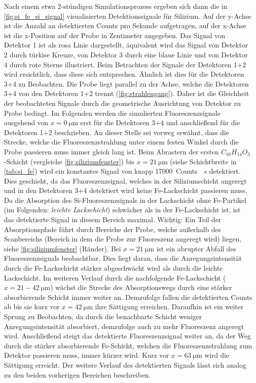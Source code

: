Nach einem etwa 2-stündigen Simulationsprozess ergeben sich dann die in \cref{fig:si_fe_si_signal} visualisierten Detektionssignale für Silizium. Auf der y-Achse ist die Anzahl an detektierten Counts pro Sekunde aufgetragen, auf der x-Achse ist die x-Position auf der Probe in Zentimeter angegeben. Das Signal von Detektor 1 ist als rosa Linie dargestellt, äquivalent wird das Signal von Detektor 2 durch türkise Kreuze, von Detektor 3 durch eine blaue Linie und von Detektor 4 durch rote Sterne illustriert. Beim Betrachten der Signale der Detektoren 1+2 wird ersichtlich, dass diese sich entsprechen. Ähnlich ist dies für die Detektoren 3+4 zu Beobachten. Die Probe liegt parallel zu der Achse, welche die Detektoren 3+4 von den Detektoren 1+2 trennt (\cref{fig:strahlengang}). Daher ist die Gleichheit der beobachteten Signale durch die geometrische Ausrichtung von Detektor zu Probe bedingt. \newlines
Im Folgenden werden die simulierten Fluoreszenzsignale ausgehend von $x=\SI{0}{\micro\meter}$ erst für die Detektoren 3+4 und anschließend für die Detektoren 1+2 beschrieben. An dieser Stelle sei vorweg erwähnt, dass die Strecke, welche die Fluoreszenzstrahlung unter einem festen Winkel durch die Probe passieren muss immer gleich lang ist.\newline
Beim Abrastern der ersten $C_{16}H_{14}O_{3}$-Schicht (vergleiche \cref{fig:siliziumfenster}) bis $x=\SI{21}{\micro\meter}$ (siehe Schichtbreite in \cref{tab:si_fe}) wird ein konstantes Signal von knapp \SI{17000}{Counts \per\second} detektiert. Dies geschieht, da das Fluoreszenzsignal, welches in der Siliziumschicht angeregt und in den Detektoren 3+4 detektiert wird keine Fe-Lackschicht passieren muss. Da die Absorption des Si-Fluoreszenzsignals in der Lackschicht ohne Fe-Partikel (im Folgenden: \textit{leichte Lackschicht}) schwächer als in der Fe-Lackschicht ist, ist das detektierte Signal in diesem Bereich maximal. Wichtig: Ein Teil der Absorptionspfade führt durch Bereiche der Probe, welche außerhalb des Scanbereichs (Bereich in dem die Probe zur Fluoreszenz angeregt wird) liegen, siehe \cref{fig:siliziumfenster} (Ränder). 
Bei $x=\SI{21}{\micro\meter}$ ist ein abrupter Abfall des Fluoreszenzsignals beobachtbar. Dies liegt daran, dass die Anregungsintensität durch die Fe-Lackschicht stärker abgeschwächt wird als durch die leichte Lackschicht. Im weiteren Verlauf durch die nachfolgende Fe-Lackschicht ($x=21-\SI{42}{\micro\meter}$) wächst die Strecke des Absorptionswegs durch eine stärker absorbierende Schicht immer weiter an. Demzufolge fallen die detektierten Counts ab bis sie kurz vor $x=\SI{42}{\micro\meter}$ ihre Sättigung erreichen. Daraufhin ist ein weiter Sprung zu Beobachten, da durch die benachbarte Schicht weniger Anregungsintensität absorbiert, demzufolge auch zu mehr Fluoreszenz angeregt wird. Anschließend steigt das detektierte Fluoreszenzsignal weiter an, da der Weg durch die stärker absorbierende Fe-Schicht, welchen die Fluoreszenzstrahlung zum Detektor passieren muss, immer kürzer wird. Kurz vor $x=\SI{63}{\micro\meter}$ wird die Sättigung erreicht. Der weitere Verlauf des detektierten Signals lässt sich analog zu den beiden vorherigen Bereichen beschreiben.\newlines
